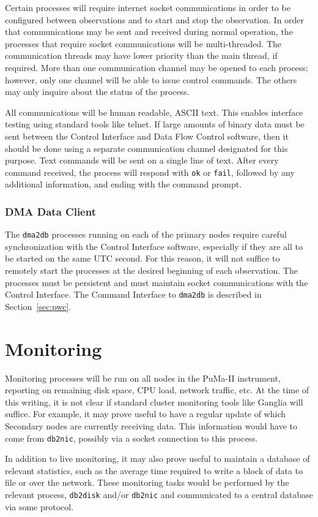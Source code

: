 Certain processes will require internet socket communications in order
to be configured between observations and to start and stop the
observation.  In order that communications may be sent and received
during normal operation, the processes that require socket
communications will be multi-threaded.  The communication threads may
have lower priority than the main thread, if required.  More than one
communication channel may be opened to each process; however, only one
channel will be able to issue control commands.  The others may only
inquire about the status of the process.

All communications will be human readable, ASCII text.  This enables
interface testing using standard tools like telnet.  If large amounts
of binary data must be sent between the Control Interface and Data
Flow Control software, then it should be done using a separate
communication channel designated for this purpose.  Text commands will
be sent on a single line of text.  After every command received, the
process will respond with {\tt ok} or {\tt fail}, followed by any
additional information, and ending with the command prompt.

\subsubsection{DMA Data Client}

The {\tt dma2db} processes running on each of the primary nodes
require careful synchronization with the Control Interface software,
especially if they are all to be started on the same UTC second.  For
this reason, it will not suffice to remotely start the processes at
the desired beginning of each observation.  The processes must be
persistent and must maintain socket communications with the Control
Interface.  The Command Interface to {\tt dma2db} is described in
Section~\ref{sec:pwc}.

\section{Monitoring}

Monitoring processes will be run on all nodes in the PuMa-II
instrument, reporting on remaining disk space, CPU load, network
traffic, etc.  At the time of this writing, it is not clear if
standard cluster monitoring tools like Ganglia will suffice.  For
example, it may prove useful to have a regular update of which
Secondary nodes are currently receiving data.  This information would
have to come from {\tt db2nic}, possibly via a socket connection to
this process.

In addition to live monitoring, it may also prove useful to maintain a
database of relevant statistics, such as the average time required to
write a block of data to file or over the network.  These monitoring
tasks would be performed by the relevant process, {\tt db2disk} and/or
{\tt db2nic} and communicated to a central database via some protocol.
